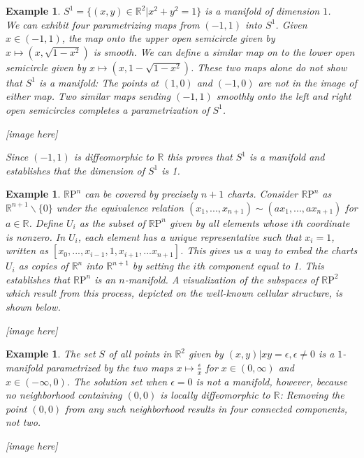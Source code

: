\documentclass{amsart}          %
\newtheorem{example}[theorem]{Example}
\newcommand{\R}{\mathbb R}
\newcommand{\RP}{\mathbb{R}\mathrm{P}}
\begin{document}
\begin{example}
	$S^1 = \{(x,y)\in \R^2 | x^2 + y^2=1\}$ is a manifold of dimension $1$. \\
	
	We can exhibit four parametrizing maps from $(-1,1)$ into $S^1$. Given $x \in (-1,1)$, the map onto the upper open semicircle given by $x\mapsto(x, \sqrt{1-x^2})$ is smooth. We can define a similar map on to the lower open semicircle given by $x \mapsto (x, 1-\sqrt{1-x^2})$. These two maps alone \textit{do not} show that $S^1$ is a manifold: The points at $(1,0)$ and $(-1,0)$ are not in the image of either map. Two similar maps sending $(-1,1)$ smoothly onto the left and right open semicircles completes a parametrization of $S^1$.  
	
	[image here]
	
	Since $(-1,1)$ is diffeomorphic to $\R$ this proves that $S^1$ is a manifold and establishes that the dimension of $S^1$ is 1. \\
\end{example} 

\begin{example}
	$\RP^n$ can be covered by precisely $n+1$ charts. Consider $\RP^n$ as $\R^{n+1} \backslash \{0\}$ under the equivalence relation $(x_1,..., x_{n+1})\sim (ax_1,...,ax_{n+1})$ for $a \in \R$. Define $U_i$ as the subset of $\RP^n$ given by all elements whose $i$th coordinate is nonzero. In $U_i$, each element has a unique representative such that $x_i=1$, written as $[x_0,...,x_{i-1},1,x_{i+1},...x_{n+1}]$. This gives us a way to embed the charts $U_i$ as copies of $\R^n$ into $\R^{n+1}$ by setting the $i$th component equal to 1. This establishes that $\RP^n$ is an $n$-manifold. A visualization of the subspaces of $\RP^2$  which result from this process, depicted on the well-known cellular structure, is shown below.
	
	[image here]  
	
\end{example}

\begin{example}
	The set $S$ of all points in $\R^2$ given by ${(x,y)|xy=\epsilon, \epsilon\neq 0}$ is a $1$-manifold parametrized by the two maps $x \mapsto \frac{\epsilon}{x}$ for $x\in (0,\infty)$ and $x \in (-\infty,0)$. The solution set when $\epsilon = 0$ is not a manifold, however, because no neighborhood containing $(0,0)$ is locally diffeomorphic to $\R$: Removing the point $(0,0)$ from any such neighborhood results in four connected components, not two.  
	
	[image here]
\end{example}
\end{document}
